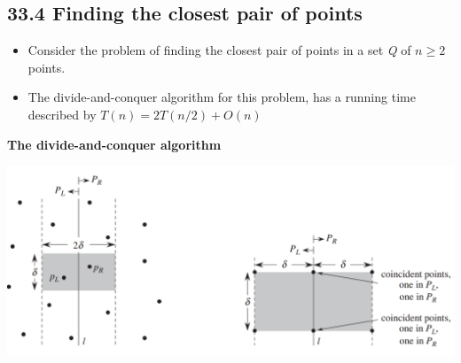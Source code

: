 \documentclass{report}
\begin{document}
\subsection*{33.4 Finding the closest pair of points}
\begin{itemize}
    \item Consider the problem of finding the closest pair of points in a set \textit{Q} of $n \geq 2$ points.
    \item The divide-and-conquer algorithm for this problem, has a running time described by $T(n) = 2T(n/2) + O(n)$
\end{itemize}
\textbf{The divide-and-conquer algorithm}
\begin{center}
    \includegraphics[width = 10 cm]{../entities/figure_33_11.png}
\end{center}
\end{document}
